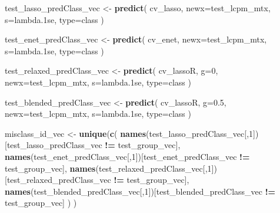 \documentclass[
]{book}
\newenvironment{Shaded}{\begin{snugshade}}{\end{snugshade}}
\newcommand{\DataTypeTok}[1]{\textcolor[rgb]{0.13,0.29,0.53}{#1}}
\newcommand{\DecValTok}[1]{\textcolor[rgb]{0.00,0.00,0.81}{#1}}
\newcommand{\FloatTok}[1]{\textcolor[rgb]{0.00,0.00,0.81}{#1}}
\newcommand{\KeywordTok}[1]{\textcolor[rgb]{0.13,0.29,0.53}{\textbf{#1}}}
\newcommand{\NormalTok}[1]{#1}
\newcommand{\OperatorTok}[1]{\textcolor[rgb]{0.81,0.36,0.00}{\textbf{#1}}}
\newcommand{\StringTok}[1]{\textcolor[rgb]{0.31,0.60,0.02}{#1}}
\begin{document}
\begin{Shaded}
\begin{Highlighting}[]
\NormalTok{test\_lasso\_predClass\_vec <{-}}\StringTok{ }\KeywordTok{predict}\NormalTok{(}
\NormalTok{ cv\_lasso,}
 \DataTypeTok{newx=}\NormalTok{test\_lcpm\_mtx,}
 \DataTypeTok{s=}\StringTok{\textquotesingle{}lambda.1se\textquotesingle{}}\NormalTok{,}
 \DataTypeTok{type=}\StringTok{\textquotesingle{}class\textquotesingle{}}
\NormalTok{)}

\NormalTok{test\_enet\_predClass\_vec <{-}}\StringTok{ }\KeywordTok{predict}\NormalTok{(}
\NormalTok{ cv\_enet,}
 \DataTypeTok{newx=}\NormalTok{test\_lcpm\_mtx,}
 \DataTypeTok{s=}\StringTok{\textquotesingle{}lambda.1se\textquotesingle{}}\NormalTok{,}
 \DataTypeTok{type=}\StringTok{\textquotesingle{}class\textquotesingle{}}
\NormalTok{)}

\NormalTok{test\_relaxed\_predClass\_vec <{-}}\StringTok{ }\KeywordTok{predict}\NormalTok{(}
\NormalTok{ cv\_lassoR,}
 \DataTypeTok{g=}\DecValTok{0}\NormalTok{,}
 \DataTypeTok{newx=}\NormalTok{test\_lcpm\_mtx,}
 \DataTypeTok{s=}\StringTok{\textquotesingle{}lambda.1se\textquotesingle{}}\NormalTok{,}
 \DataTypeTok{type=}\StringTok{\textquotesingle{}class\textquotesingle{}}
\NormalTok{)}

\NormalTok{test\_blended\_predClass\_vec <{-}}\StringTok{ }\KeywordTok{predict}\NormalTok{(}
\NormalTok{ cv\_lassoR,}
 \DataTypeTok{g=}\FloatTok{0.5}\NormalTok{,}
 \DataTypeTok{newx=}\NormalTok{test\_lcpm\_mtx,}
 \DataTypeTok{s=}\StringTok{\textquotesingle{}lambda.1se\textquotesingle{}}\NormalTok{,}
 \DataTypeTok{type=}\StringTok{\textquotesingle{}class\textquotesingle{}}
\NormalTok{)}

\NormalTok{misclass\_id\_vec <{-}}\StringTok{ }\KeywordTok{unique}\NormalTok{(}\KeywordTok{c}\NormalTok{(}
 \KeywordTok{names}\NormalTok{(test\_lasso\_predClass\_vec[,}\DecValTok{1}\NormalTok{])[test\_lasso\_predClass\_vec }\OperatorTok{!=}\StringTok{ }\NormalTok{test\_group\_vec],}
 \KeywordTok{names}\NormalTok{(test\_enet\_predClass\_vec[,}\DecValTok{1}\NormalTok{])[test\_enet\_predClass\_vec }\OperatorTok{!=}\StringTok{ }\NormalTok{test\_group\_vec],}
 \KeywordTok{names}\NormalTok{(test\_relaxed\_predClass\_vec[,}\DecValTok{1}\NormalTok{])[test\_relaxed\_predClass\_vec }\OperatorTok{!=}\StringTok{ }\NormalTok{test\_group\_vec],}
 \KeywordTok{names}\NormalTok{(test\_blended\_predClass\_vec[,}\DecValTok{1}\NormalTok{])[test\_blended\_predClass\_vec }\OperatorTok{!=}\StringTok{ }\NormalTok{test\_group\_vec]}
\NormalTok{ )}
\NormalTok{)}



\end{Highlighting}
\end{Shaded}
\end{document}
